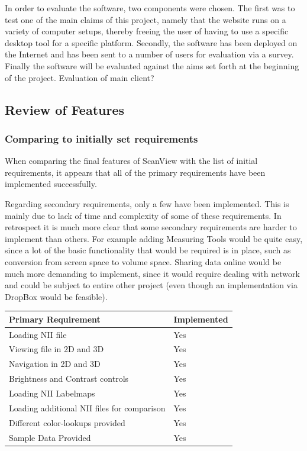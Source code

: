 \documentclass[a4paper,11pt,titlepage]{article}
\begin{document}
In order to evaluate the software, two components were chosen. The first was to test one of the main claims of this project, namely that the website runs on a variety of computer setups, thereby freeing the user of having to use a specific desktop tool for a specific platform. Secondly, the software has been deployed on the Internet and has been sent to a number of users for evaluation via a survey. Finally the software will be evaluated against the aims set forth at the beginning of the project.
Evaluation of main client?







\subsection{Review of Features}

\subsubsection{Comparing to initially set requirements}

When comparing the final features of ScanView with the list of initial requirements, it appears that all of the primary requirements have been implemented successfully.


Regarding secondary requirements, only a few have been implemented. This is mainly due to lack of time and complexity of some of these requirements. In retrospect it is much more clear that some secondary requirements are harder to implement than others. For example adding Measuring Tools would be quite easy, since a lot of the basic functionality that would be required is in place, such as conversion from screen space to volume space. Sharing data online would be much more demanding to implement, since it would require dealing with network and could be subject to entire other project (even though an implementation via DropBox would be feasible).



\begin{center}

  \begin{tabular}{| l | l |}
    \hline
    Primary Requirement & Implemented \\ \hline \hline
	Loading NII file & Yes\\ \hline
	Viewing file in 2D and 3D & Yes\\ \hline
	Navigation in 2D and 3D & Yes\\ \hline
	Brightness and Contrast controls & Yes \\ \hline
	Loading NII Labelmaps & Yes \\ \hline
	Loading additional NII files for comparison & Yes \\ \hline
	Different color-lookups provided & Yes \\ \hline
	Sample Data Provided & Yes \\ \hline

  \end{tabular}\\
\end{center}
\end{document}
